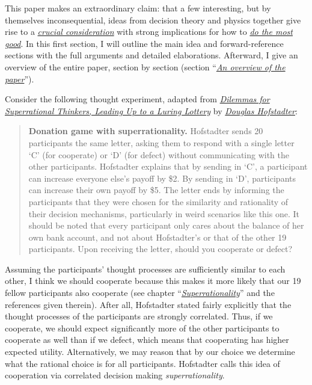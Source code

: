 This paper makes an extraordinary claim: that a few interesting, but by
themselves inconsequential, ideas from decision theory and physics
together give rise to a
\href{https://concepts.effectivealtruism.org/concepts/the-importance-of-crucial-considerations/}{\emph{crucial
consideration}} with strong implications for how to
\href{https://en.wikipedia.org/wiki/Effective_altruism}{\emph{do the
most good}}. In this first section, I will outline the main idea and
forward-reference sections with the full arguments and detailed
elaborations. Afterward, I give an overview of the entire paper, section
by section (section
``\protect\hyperlink{an-overview-of-the-paper}{\emph{An overview of the
paper}}'').

Consider the following thought experiment, adapted from
\href{https://www.gwern.net/docs/1985-hofstadter\#dilemmas-for-superrational-thinkers-leading-up-to-a-luring-lottery}{\emph{\emph{Dilemmas
for Superrational Thinkers, Leading Up to a Luring Lottery}}} by
\href{https://en.wikipedia.org/wiki/Douglas_Hofstadter}{\emph{Douglas
Hofstadter}}:

\begin{quote}
\textbf{Donation game with superrationality.} Hofstadter sends 20
participants the same letter, asking them to respond with a single
letter `C' (for cooperate) or `D' (for defect) without communicating
with the other participants. Hofstadter explains that by sending in `C',
a participant can increase everyone else's payoff by \$2. By sending in
`D', participants can increase their own payoff by \$5. The letter ends
by informing the participants that they were chosen for the similarity
and rationality of their decision mechanisms, particularly in weird
scenarios like this one. It should be noted that every participant only
cares about the balance of her own bank account, and not about
Hofstadter's or that of the other 19 participants. Upon receiving the
letter, should you cooperate or defect?
\end{quote}

Assuming the participants' thought processes are sufficiently similar to
each other, I think we should cooperate because this makes it more
likely that our 19 fellow participants also cooperate (see chapter
``\protect\hyperlink{superrationality}{\emph{Superrationality}}'' and
the references given therein). After all, Hofstadter stated fairly
explicitly that the thought processes of the participants are strongly
correlated. Thus, if we cooperate, we should expect significantly more
of the other participants to cooperate as well than if we defect, which
means that cooperating has higher expected utility. Alternatively, we
may reason that by our choice we determine what the rational choice is
for all participants. Hofstadter calls this idea of cooperation via
correlated decision making \emph{superrationality}.

